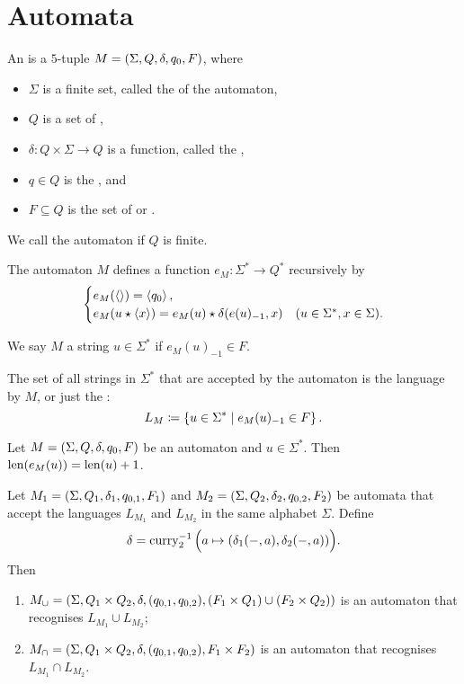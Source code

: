 \section{Automata}
\begin{definition}
An  is a $5$-tuple $M = \left( \Sigma, Q, \delta, q_0, F \right)$, where
\begin{itemize}
\item $\Sigma$ is a finite set, called the  of the automaton,
\item $Q$ is a set of ,
\item $\delta: Q\times \Sigma\to Q$ is a function, called the ,
\item $q\in Q$ is the , and
\item $F\subseteq Q$ is the set of  or .
\end{itemize}
We call the automaton  if $Q$ is finite.

The automaton $M$ defines a function $e_M: \Sigma^* \to Q^*$ recursively by
\[ \begin{cases}
e_M(\left\langle  \right\rangle) = \left\langle q_0 \right\rangle, \\
e_M(u\star \left\langle x \right\rangle) = e_M(u)\star \delta(e(u)_{-1}, x) & (u\in \Sigma^*, x\in \Sigma).
\end{cases} \]

We say $M$  a string $u\in \Sigma^*$ if $e_M(u)_{-1} \in F$.

The set of all strings in $\Sigma^*$ that are accepted by the automaton is the language  by $M$, or just the :
\[ L_M \coloneqq \left\{ u\in\Sigma^* \;\middle|\; e_M(u)_{-1} \in F \right\}. \]
\end{definition}

\begin{lemma} \label{automatonExecutionLength}
Let $M = \left( \Sigma, Q, \delta, q_0, F \right)$ be an automaton and $u\in \Sigma^*$. Then $\operatorname{len}(e_M(u)) = \operatorname{len}(u)+1$.
\end{lemma}

\begin{proposition}
Let $M_1 = \left( \Sigma, Q_1, \delta_1, q_{0,1}, F_1 \right)$ and $M_2 = \left( \Sigma, Q_2, \delta_2, q_{0,2}, F_2 \right)$ be automata that accept the languages $L_{M_1}$ and $L_{M_2}$ in the same alphabet $\Sigma$. Define
\[ \delta = \operatorname{curry}_2^{-1}\Big(a\mapsto (\delta_1(-, a), \delta_2(-, a))\Big). \]
Then
\begin{enumerate}
\item $M_{\cup} = \left( \Sigma, Q_1\times Q_2, \delta, (q_{0,1}, q_{0,2}), (F_1\times Q_1) \cup (F_2\times Q_2) \right)$ is an automaton that recognises $L_{M_1}\cup L_{M_2}$;
\item $M_{\cap} = \left( \Sigma, Q_1\times Q_2, \delta, (q_{0,1}, q_{0,2}), F_1 \times F_2 \right)$ is an automaton that recognises $L_{M_1}\cap L_{M_2}$.
\end{enumerate}
\end{proposition}

